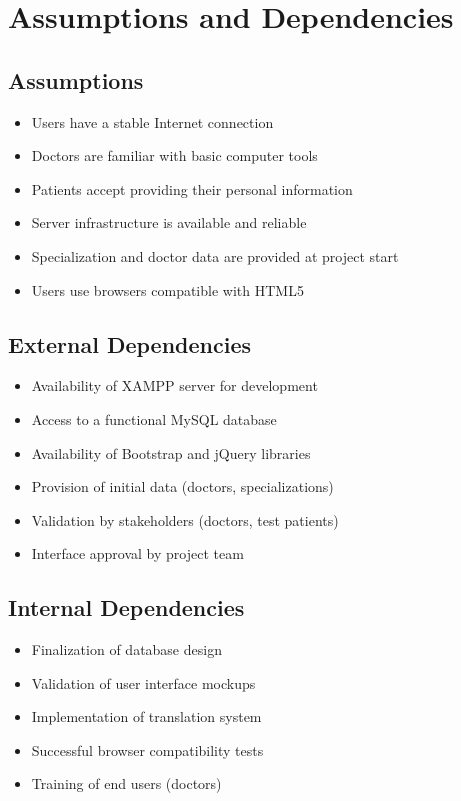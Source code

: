 \documentclass[12pt,a4paper]{report}
\begin{document}
\section{Assumptions and Dependencies}

\subsection{Assumptions}
\begin{itemize}
    \item Users have a stable Internet connection
    \item Doctors are familiar with basic computer tools
    \item Patients accept providing their personal information
    \item Server infrastructure is available and reliable
    \item Specialization and doctor data are provided at project start
    \item Users use browsers compatible with HTML5
\end{itemize}

\subsection{External Dependencies}
\begin{itemize}
    \item Availability of XAMPP server for development
    \item Access to a functional MySQL database
    \item Availability of Bootstrap and jQuery libraries
    \item Provision of initial data (doctors, specializations)
    \item Validation by stakeholders (doctors, test patients)
    \item Interface approval by project team
\end{itemize}

\subsection{Internal Dependencies}
\begin{itemize}
    \item Finalization of database design
    \item Validation of user interface mockups
    \item Implementation of translation system
    \item Successful browser compatibility tests
    \item Training of end users (doctors)
\end{itemize}
\end{document}

